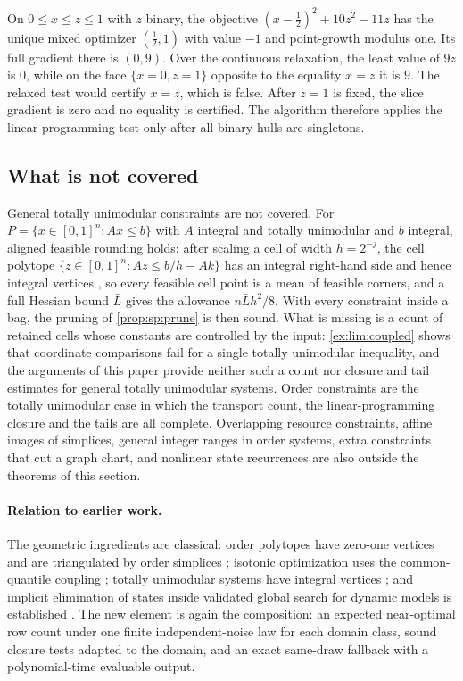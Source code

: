 \begin{example}\label{ex:con:premature}
On $0\le x\le z\le1$ with $z$ binary, the objective
$(x-\frac12)^2+10z^2-11z$ has the unique mixed optimizer $(\frac12,1)$ with
value $-1$ and point-growth modulus one. Its full gradient there is $(0,9)$.
Over the continuous relaxation, the least value of $9z$ is $0$, while on the
face $\{x=0,z=1\}$ opposite to the equality $x=z$ it is $9$. The relaxed test
would certify $x=z$, which is false. After $z=1$ is fixed, the slice gradient
is zero and no equality is certified. The algorithm therefore applies the
linear-programming test only after all binary hulls are singletons.
\end{example}

\subsection{What is not covered}\label{sec:con:scope}

General totally unimodular constraints are not covered. For
$P=\{x\in[0,1]^n:Ax\le b\}$ with $A$ integral and totally unimodular and $b$
integral, aligned feasible rounding holds: after scaling a cell of width
$h=2^{-j}$, the cell polytope $\{z\in[0,1]^n:Az\le b/h-Ak\}$ has an integral
right-hand side and hence integral vertices
\citep{hoffman1956-integral-boundary-points-of-convex}, so every feasible cell point is a mean of feasible
corners, and a full Hessian bound $\bar L$ gives the allowance
$n\bar Lh^2/8$. With every constraint inside a bag, the pruning of
\cref{prop:sp:prune} is then sound. What is missing is a count of retained
cells whose constants are controlled by the input: \cref{ex:lim:coupled}
shows that coordinate comparisons fail for a single totally unimodular
inequality, and the arguments of this paper provide neither such a count
nor closure and tail estimates for general totally unimodular systems. Order
constraints are the totally unimodular case in which the transport count,
the linear-programming closure and the tails are all complete. Overlapping resource constraints, affine
images of simplices, general integer ranges in order systems, extra
constraints that cut a graph chart, and nonlinear state recurrences are also
outside the theorems of this section.

\paragraph{Relation to earlier work.} The geometric ingredients are
classical: order polytopes have zero-one vertices and are triangulated by
order simplices \citep{stanley1986-two-poset-polytopes}; isotonic optimization uses the
common-quantile coupling \citep{bach2018-efficient-algorithms-for-non-convex}; totally unimodular
systems have integral vertices \citep{hoffman1956-integral-boundary-points-of-convex}; and implicit
elimination of states inside validated global search for dynamic models is
established \citep{wilhelm2019-global-optimization-of-stiff-dynamical}. The new element is again the
composition: an expected near-optimal row count under one finite
independent-noise law for each domain class, sound closure tests adapted to
the domain, and an exact same-draw fallback with a polynomial-time
evaluable output.
